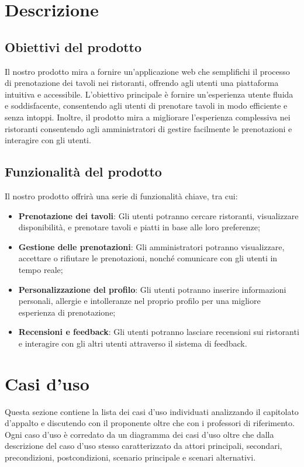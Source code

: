 \documentclass[12pt, oneside]{article}
\begin{document}
\section{Descrizione}
\subsection{Obiettivi del prodotto}
Il nostro prodotto mira a fornire un'applicazione web che semplifichi il processo di prenotazione dei tavoli nei ristoranti, offrendo agli utenti una piattaforma intuitiva e accessibile. L'obiettivo principale è fornire un'esperienza utente fluida e soddisfacente, consentendo agli utenti di prenotare tavoli in modo efficiente e senza intoppi. Inoltre, il prodotto mira a migliorare l'esperienza complessiva nei ristoranti consentendo agli amministratori di gestire facilmente le prenotazioni e interagire con gli utenti.

\subsection{Funzionalità del prodotto}
Il nostro prodotto offrirà una serie di funzionalità chiave, tra cui:
\begin{itemize}
\item \textbf{Prenotazione dei tavoli}: Gli utenti potranno cercare ristoranti, visualizzare disponibilità, e prenotare tavoli e piatti in base alle loro preferenze;
\item \textbf{Gestione delle prenotazioni}: Gli amministratori potranno visualizzare, accettare o rifiutare le prenotazioni, nonché comunicare con gli utenti in tempo reale;
\item \textbf{Personalizzazione del profilo}: Gli utenti potranno inserire informazioni personali, allergie e intolleranze nel proprio profilo per una migliore esperienza di prenotazione;
\item \textbf{Recensioni e feedback}: Gli utenti potranno lasciare recensioni sui ristoranti e interagire con gli altri utenti attraverso il sistema di feedback.
\end{itemize}


\newpage

\section{Casi d'uso}
Questa sezione contiene la lista dei casi d'uso individuati analizzando il capitolato d'appalto e discutendo con il proponente oltre che con i professori di riferimento. Ogni caso d'uso è corredato da un diagramma dei casi d'uso oltre che dalla descrizione del caso d'uso stesso caratterizzato da attori principali, secondari, precondizioni, postcondizioni, scenario principale e scenari alternativi.
\end{document}
